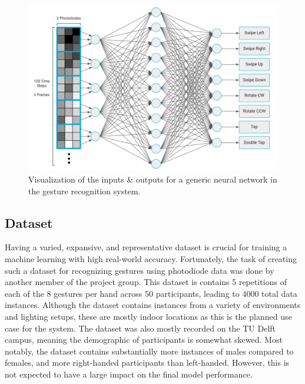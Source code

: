 \begin{figure}[h]
    \centering
    \captionsetup{justification=centering}
    \includegraphics[width=\linewidth]{figures/system_advanced}
    \caption{Visualization of the inputs \& outputs for a generic neural network in the gesture recognition system.}
    \label{fig:system}
\end{figure}

\subsection{Dataset}\label{subsec:dataset}
Having a varied, expansive, and representative dataset is crucial for training a machine learning with high real-world accuracy.
Fortunately, the task of creating such a dataset for recognizing gestures using photodiode data was done by another member of the project group.
This dataset is contains 5 repetitions of each of the 8 gestures per hand across 50 participants, leading to 4000 total data instances.
Although the dataset contains instances from a variety of environments and lighting setups, these are mostly indoor locations as this is the planned use case for the system.
The dataset was also mostly recorded on the TU Delft campus, meaning the demographic of participants is somewhat skewed.
Most notably, the dataset contains substantially more instances of males compared to females, and more right-handed participants than left-handed.
However, this is not expected to have a large impact on the final model performance.